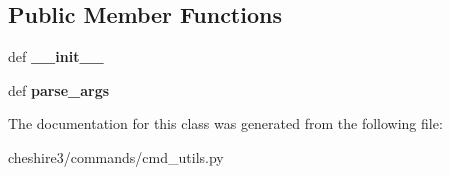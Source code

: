 \subsection*{Public Member Functions}
\begin{DoxyCompactItemize}
\item 
\hypertarget{classcheshire3_1_1commands_1_1cmd__utils_1_1_cheshire3_argument_parser_abb4307dfccc3d3825ac9f2466583c110}{def {\bfseries \-\_\-\-\_\-init\-\_\-\-\_\-}}\label{classcheshire3_1_1commands_1_1cmd__utils_1_1_cheshire3_argument_parser_abb4307dfccc3d3825ac9f2466583c110}

\item 
\hypertarget{classcheshire3_1_1commands_1_1cmd__utils_1_1_cheshire3_argument_parser_a07f27728bb75c904820c384a9419559b}{def {\bfseries parse\-\_\-args}}\label{classcheshire3_1_1commands_1_1cmd__utils_1_1_cheshire3_argument_parser_a07f27728bb75c904820c384a9419559b}

\end{DoxyCompactItemize}


The documentation for this class was generated from the following file\-:\begin{DoxyCompactItemize}
\item 
cheshire3/commands/cmd\-\_\-utils.\-py\end{DoxyCompactItemize}
